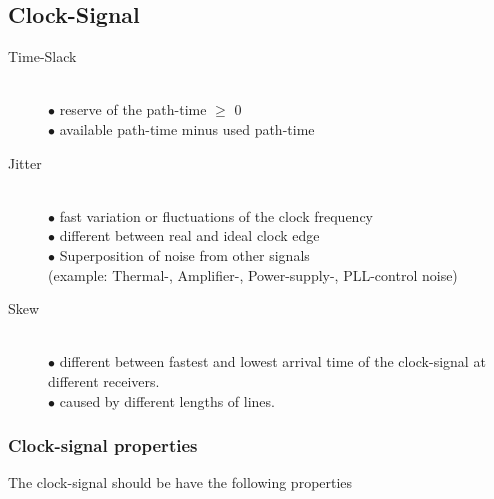 \subsection{Clock-Signal}
\begin{description}
	\item[Time-Slack] \hfill \\
		$\bullet$ reserve of the path-time $\geq$ 0 \\
		$\bullet$ available path-time minus used path-time 
		
	\item[Jitter] \hfill \\
		$\bullet$ fast variation or fluctuations of the clock frequency \\
		$\bullet$ different between real and ideal clock edge \\
		$\bullet$ Superposition of noise from other signals \\ (example: Thermal-, Amplifier-, Power-supply-, PLL-control noise)
		
	\item[Skew] \hfill \\
		$\bullet$ different between fastest and lowest arrival time of the clock-signal at different receivers.\\
		$\bullet$ caused by different lengths of lines.
\end{description}
\newpage
\subsubsection{Clock-signal properties}
The clock-signal should be have the following properties

